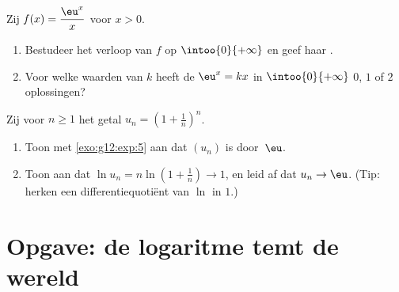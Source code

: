 \begin{exercise}[$\star\star\star$]\label{exo:g12:exp:8}
Zij $f(x) = \dfrac{\eu^x}{x}$ voor $x > 0$.
\begin{enumerate}
  \item Bestudeer het verloop van $f$ op $\intoo{0}{+\infty}$ en geef haar
        .
  \item Voor welke waarden van $k$ heeft de  $\eu^x = kx$ in
        $\intoo{0}{+\infty}$ $0$, $1$ of $2$ oplossingen?
\end{enumerate}
\end{exercise}

\begin{exercise}[$\star\star\star$]\label{exo:g12:exp:9}
Zij voor $n \geq 1$ het getal $u_n = \left(1 + \frac1n\right)^n$.
\begin{enumerate}
  \item Toon met \cref{exo:g12:exp:5} aan dat $(u_n)$  is
        door~$\eu$.
  \item Toon aan dat $\ln u_n = n \ln\left(1 + \frac1n\right) \to 1$, en leid
        af dat $u_n \to \eu$. (Tip: herken een differentiequotiënt van $\ln$
        in $1$.)
\end{enumerate}
\end{exercise}

\section{Opgave: de logaritme temt de wereld}

